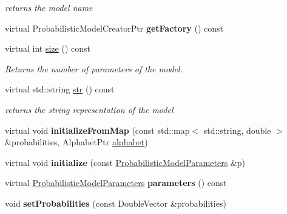\begin{DoxyCompactItemize}
\begin{DoxyCompactList}\small\item\em returns the model name \end{DoxyCompactList}\item 
\mbox{\label{classtops_1_1DiscreteIIDModel_a62218b116d392f5d64a373d94fb79bbc}} 
virtual Probabilistic\+Model\+Creator\+Ptr {\bfseries get\+Factory} () const
\item 
\mbox{\label{classtops_1_1DiscreteIIDModel_aa486a4a7ba0b77de10160eddce2c8ef5}} 
virtual int \hyperlink{classtops_1_1DiscreteIIDModel_aa486a4a7ba0b77de10160eddce2c8ef5}{size} () const
\begin{DoxyCompactList}\small\item\em Returns the number of parameters of the model. \end{DoxyCompactList}\item 
\mbox{\label{classtops_1_1DiscreteIIDModel_a789bb1abb116d6d2129b7d2316a9078e}} 
virtual std\+::string \hyperlink{classtops_1_1DiscreteIIDModel_a789bb1abb116d6d2129b7d2316a9078e}{str} () const
\begin{DoxyCompactList}\small\item\em returns the string representation of the model \end{DoxyCompactList}\item 
\mbox{\label{classtops_1_1DiscreteIIDModel_ae13af8f2d01b6c80c2966dec700ebb36}} 
virtual void {\bfseries initialize\+From\+Map} (const std\+::map$<$ std\+::string, double $>$ \&probabilities, Alphabet\+Ptr \hyperlink{classtops_1_1ProbabilisticModel_acacbfeb9cce968e034b5c18c72f7e217}{alphabet})
\item 
\mbox{\label{classtops_1_1DiscreteIIDModel_a7304a326d3a637434709648a29226c0e}} 
virtual void {\bfseries initialize} (const \hyperlink{classtops_1_1ProbabilisticModelParameters}{Probabilistic\+Model\+Parameters} \&p)
\item 
\mbox{\label{classtops_1_1DiscreteIIDModel_aa144ea7f69b42517343170dd44cf50e8}} 
virtual \hyperlink{classtops_1_1ProbabilisticModelParameters}{Probabilistic\+Model\+Parameters} {\bfseries parameters} () const
\item 
\mbox{\label{classtops_1_1DiscreteIIDModel_a607a50d8fca66f3f71970830cc08c728}} 
void {\bfseries set\+Probabilities} (const Double\+Vector \&probabilities)
\end{DoxyCompactItemize}


